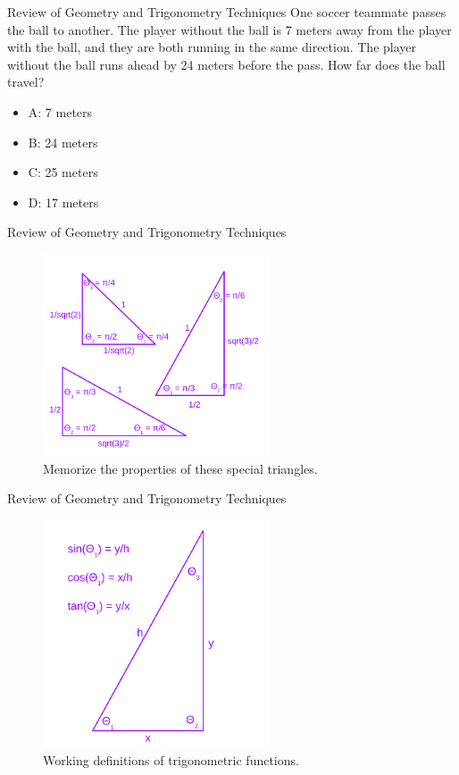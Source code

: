 \documentclass{beamer}
\begin{document}
\begin{frame}{Review of Geometry and Trigonometry Techniques}
One soccer teammate passes the ball to another.  The player without the ball is 7 meters away from the player with the ball, and they are both running in the same direction.  The player without the ball runs ahead by 24 meters before the pass.  How far does the ball travel? \\
\begin{itemize}
\item A: 7 meters
\item B: 24 meters
\item C: 25 meters
\item D: 17 meters
\end{itemize}
\end{frame}

\begin{frame}{Review of Geometry and Trigonometry Techniques}
\small
\begin{figure}
\centering
\includegraphics[width=0.6\textwidth]{figures/triangles.pdf}
\caption{\label{fig:triangles} \alert{Memorize} the properties of these special triangles.}
\end{figure}
\end{frame}

\begin{frame}{Review of Geometry and Trigonometry Techniques}
\small
\begin{figure}
\centering
\includegraphics[width=0.6\textwidth]{figures/triangles2.pdf}
\caption{\label{fig:triangles2} Working definitions of trigonometric functions.}
\end{figure}
\end{frame}
\end{document}
